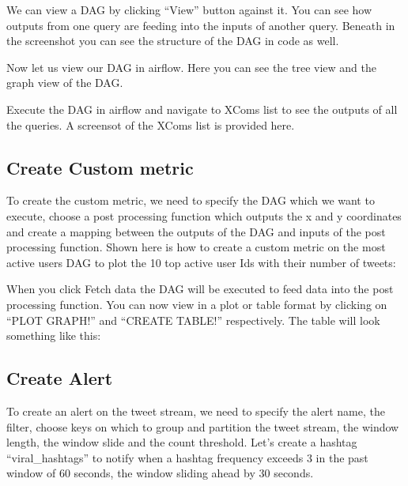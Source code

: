 \documentclass[letterpaper,10pt,english]{sphinxmanual}
\begin{document}
We can view a DAG by clicking “View” button against it. You can see how outputs from one query are feeding into the inputs of another query. Beneath in the screenshot you can see the structure of the DAG in code as well.

\noindent{}

Now let us view our DAG in airflow. Here you can see the tree view and the graph view of the DAG.

  

Execute the DAG in airflow and navigate to XComs list to see the outputs of all the queries. A screensot of the XComs list is provided here.

\noindent{}


\subsection{Create Custom metric}
\label{\detokenize{dashboard_website:create-custom-metric}}
To create the custom metric, we need to specify the DAG which we want to execute, choose a post processing function which outputs the x and y coordinates and create a mapping between the outputs of the DAG and inputs of the post processing function. Shown here is how to create a custom metric on the most active users DAG to plot the 10 top active user Ids with their number of tweets:

\noindent{}

When you click Fetch data the DAG will be executed to feed data into the post processing function. You can now view in a plot or table format by clicking on “PLOT GRAPH!” and “CREATE TABLE!” respectively. The table will look something like this:

\noindent{}


\subsection{Create Alert}
\label{\detokenize{dashboard_website:create-alert}}
To create an alert on the tweet stream, we need to specify the alert name, the filter, choose keys on which to group and partition the tweet stream, the window length, the window slide and the count threshold. Let’s create a hashtag “viral\_hashtags” to notify when a hashtag frequency exceeds 3 in the past window of 60 seconds, the window sliding ahead by 30 seconds.
\end{document}
